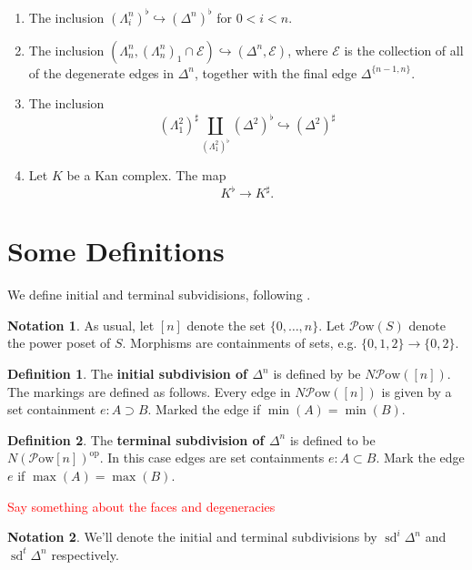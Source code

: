 \documentclass[english]{amsart}
\newcommand{\mc}{\mathcal}
\newcommand{\ques}[1]{\textcolor{red}{#1}}
\theoremstyle{definition}
\newtheorem*{defn}{Definition}
\newtheorem*{notation}{Notation}
\begin{document}
\begin{enumerate}
\item The inclusion $(\Lambda^n_i)^\flat \hookrightarrow (\Delta^n)^\flat$ for $0 < i < n$. 
\item The inclusion $(\Lambda^n_n, (\Lambda^n_n)_1 \cap \mc{E}) \hookrightarrow (\Delta^n, \mc{E})$, where $\mc{E}$ is the collection of all of the degenerate edges in $\Delta^n$, together with the final edge $\Delta^{\{n-1,n\}}$. 
\item The inclusion
\[
(\Lambda^2_1)^\sharp \coprod_{(\Lambda^2_1)^\flat} (\Delta^2)^\flat \hookrightarrow (\Delta^2)^\sharp
\]
\item Let $K$ be a Kan complex. The map
\[
K^\flat \to K^\sharp. 
\]
\end{enumerate}

\section{Some Definitions}

We define initial and terminal subvidisions, following \cite{Barwick:2010wj}. 

\begin{notation}
As usual, let $[n]$ denote the set $\{0, \dots, n\}$.  Let $\mc{P}\text{ow}(S)$ denote the power poset of $S$. Morphisms are containments of sets, e.g. $\{0,1,2\} \to \{0,2\}$.  
\end{notation}

\begin{defn}
The \textbf{initial subdivision of $\Delta^n$} is defined by be $N \mc{P}\text{ow}([n])$. The markings are defined as follows. Every edge in $N \mc{P}\text{ow}([n])$ is given by a set containment $e : A \supset B$. Marked the edge if $\operatorname{min}(A) = \operatorname{min}(B)$. 
\end{defn}

\begin{defn}
The \textbf{terminal subdivision of $\Delta^n$} is defined to be $N (\mc{P}\text{ow}[n])^{\text{op}}$. In this case edges are set containments $e: A \subset B$. Mark the edge $e$ if $\max (A) =\max(B)$. 
\end{defn}

\ques{Say something about the faces and degeneracies}

\begin{notation}
We'll denote the initial and terminal subdivisions by $\operatorname{sd}^i \Delta^n$ and $\operatorname{sd}^t \Delta^n$ respectively. 
\end{notation}
\end{document}
